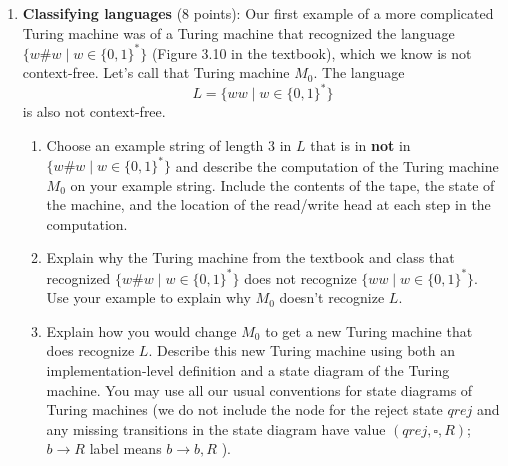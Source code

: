 \begin{enumerate}[wide, labelwidth=!, labelindent=0pt]
\begin{enumerate}
\end{enumerate}

\item\textbf{Classifying languages} (8 points):
Our first example of a more complicated Turing machine was of a Turing machine 
that recognized the language $\{w \# w \mid w \in\{0,1\}^*\}$ 
(Figure 3.10 in the textbook), which we 
know is not context-free. Let's call that Turing machine $M_0$. The language
\[
    L = \{ww \mid w \in \{0,1\}^*\}
\]
is also not context-free. 

\begin{enumerate}
    \item\gradeCorrect Choose an example string of length $3$ in $L$ that is in {\bf not} in $\{w \# w \mid w \in\{0,1\}^*\}$ and describe the computation of the Turing machine $M_0$ on your example string. 
    Include the contents of the  tape, the state of the machine, and the location of the read/write head at each step in the computation.
    \item\gradeComplete Explain why the Turing machine from the textbook 
    and class that recognized $\{w \# w \mid w \in\{0,1\}^*\}$ does 
    not recognize $\{ww \mid w \in \{0,1\}^*\}$. Use your example to explain why $M_0$ doesn't recognize $L$.
    \item\gradeComplete Explain how you would change $M_0$ to get a 
    new Turing machine that does recognize $L$. Describe this new Turing machine using both an implementation-level definition and a state diagram of the Turing machine. You may use all 
    our usual conventions for state diagrams of Turing machines 
    (we do not include the node for the reject state $qrej$ and any missing transitions 
    in the state diagram have value $(qrej,\square,R)$; 
    $b \to R$ label means $b \to b, R$ ).
\end{enumerate}
\end{enumerate}
